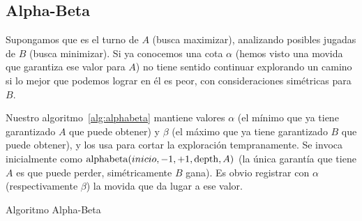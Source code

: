 \subsection{Alpha-Beta}
\label{seq:alphabeta}

  Supongamos que es el turno de \(A\)
  (busca maximizar),
  analizando posibles jugadas de \(B\)
  (busca minimizar).
  Si ya conocemos una cota \(\alpha\)
  (hemos visto una movida que garantiza ese valor para \(A\))
  no tiene sentido continuar explorando un camino
  si lo mejor que podemos lograr en él es peor,
  con consideraciones simétricas para \(B\).

  Nuestro algoritmo~\ref{alg:alphabeta}
  mantiene valores \(\alpha\)
  (el mínimo que ya tiene garantizado \(A\) que puede obtener)
  y \(\beta\)
  (el máximo que ya tiene garantizado \(B\) que puede obtener),
  y los usa para cortar la exploración tempranamente.
  Se invoca inicialmente
  como \(\mathrm{alphabeta}(\mathnormal{inicio},
           -1, +1, \mathrm{depth}, A)\)
  (la única garantía que tiene \(A\) es que puede perder,
   simétricamente \(B\) gana).
  Es obvio registrar con \(\alpha\)
  (respectivamente \(\beta\))
  la movida que da lugar a ese valor.
  \begin{algorithm}
    \DontPrintSemicolon\Indp

    \caption{Algoritmo Alpha-Beta}
    \label{alg:alphabeta}
  \end{algorithm}
